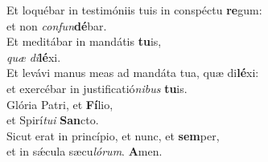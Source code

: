 \evenverse Et loquébar in testimóniis tuis in conspéctu \textbf{re}gum:~\*\\
\evenverse et non \textit{con}\textit{fun}\textbf{dé}bar.\\
\oddverse Et meditábar in mandátis \textbf{tu}is,~\*\\
\oddverse \textit{quæ} \textit{di}\textbf{lé}xi.\\
\evenverse Et levávi manus meas ad mandáta tua, quæ di\textbf{lé}xi:~\*\\
\evenverse et exercébar in justificatió\textit{ni}\textit{bus} \textbf{tu}is.\\
\oddverse Glória Patri, et \textbf{Fí}lio,~\*\\
\oddverse et Spirí\textit{tu}\textit{i} \textbf{San}cto.\\
\evenverse Sicut erat in princípio, et nunc, et \textbf{sem}per,~\*\\
\evenverse et in sǽcula sæcu\textit{ló}\textit{rum}. \textbf{A}men.\\
